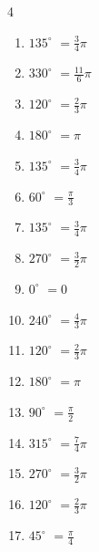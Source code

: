 \begin{multicols}{4}
\begin{enumerate}
  \item $\displaystyle 135^{\circ}$
        $\displaystyle =\frac{3}{4}\pi$

  \item $\displaystyle 330^{\circ}$
        $\displaystyle =\frac{11}{6}\pi$

  \item $\displaystyle 120^{\circ}$
        $\displaystyle =\frac{2}{3}\pi$

  \item $\displaystyle 180^{\circ}$
        $\displaystyle =\pi$

\columnbreak %

  \item $\displaystyle 135^{\circ}$
        $\displaystyle =\frac{3}{4}\pi$

  \item $\displaystyle 60^{\circ}$
        $\displaystyle =\frac{\pi}{3}$

  \item $\displaystyle 135^{\circ}$
        $\displaystyle =\frac{3}{4}\pi$

  \item $\displaystyle 270^{\circ}$
        $\displaystyle =\frac{3}{2}\pi$

  \item $\displaystyle 0^{\circ}$
        $\displaystyle =0$

  \item $\displaystyle 240^{\circ}$
        $\displaystyle =\frac{4}{3}\pi$

  \item $\displaystyle 120^{\circ}$
        $\displaystyle =\frac{2}{3}\pi$

  \item $\displaystyle 180^{\circ}$
        $\displaystyle =\pi$

  \item $\displaystyle 90^{\circ}$
        $\displaystyle =\frac{\pi}{2}$

  \item $\displaystyle 315^{\circ}$
        $\displaystyle =\frac{7}{4}\pi$

  \item $\displaystyle 270^{\circ}$
        $\displaystyle =\frac{3}{2}\pi$

  \item $\displaystyle 120^{\circ}$
        $\displaystyle =\frac{2}{3}\pi$

  \item $\displaystyle 45^{\circ}$
        $\displaystyle =\frac{\pi}{4}$


\end{enumerate}
\end{multicols}
